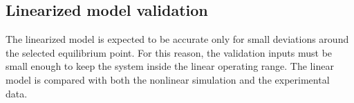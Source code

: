 \subsection{Linearized model validation}

The linearized model is expected to be accurate only for small deviations around the selected equilibrium point. For this reason, the validation inputs must be small enough to keep the system inside the linear operating range. The linear model is compared with both the nonlinear simulation and the experimental data.
